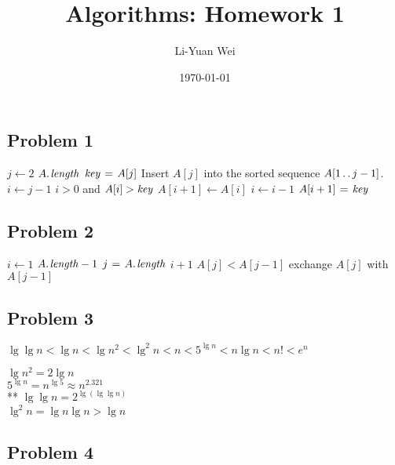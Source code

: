 \documentclass[a4paper]{article}
\makeatletter
\newenvironment{solution}
  {\begin{proof}[Solution]}
  {\end{proof}}
\renewenvironment{proof}[1][\proofname]{%
  \par\pushQED{\qed}\normalfont%
  \topsep6\p@\@plus6\p@\relax
  \trivlist\item[\hskip\labelsep\bfseries#1\@addpunct{.}]%
  \ignorespaces
}{%
  \popQED\endtrivlist\@endpefalse
}
\makeatother
\begin{document}
\title{Algorithms: Homework 1}
\author{Li-Yuan Wei}
\date{\today}
\maketitle

\subsection*{Problem 1}
\begin{codebox}
\li \For $j \gets 2$ \To $\attrib{A}{length}$
\li \Do
$\id{key} \gets A[j]$
\li \Comment Insert $A[j]$ into the sorted sequence
$A[1 \mathinner{\ldotp\ldotp} j-1]$.
\li $i \gets j-1$
\li \While $i > 0$ and $A[i] > \id{key}$
\li \Do
$A[i+1] \gets A[i]$
\li $i \gets i-1$
\End
\li $A[i+1] \gets \id{key}$
\End
\end{codebox}

\begin{solution}
\end{solution}

\subsection*{Problem 2}
\begin{codebox}
\li \For $i \gets 1$ \To $\attrib{A}{length} - 1$
\li \Do \For $j \gets \attrib{A}{length}$ \Downto $i + 1$
\li \Do \If $A[j] < A[j-1]$
\li \Then exchange $A[j]$ with $A[j-1]$
\End
\End
\End
\end{codebox}

\begin{solution}
\end{solution}

\subsection*{Problem 3}

\begin{solution}
  $\lg\lg n < \lg n < \lg n^2 < \lg^2 n< n < 5^{\lg n} < n \lg n < n! < e^n$

 $\lg n^2 = 2\lg n$ \\
 $5^{\lg n} = n^{\lg 5} \approx n^{2.321}$ \\
 ** $\lg\lg n = 2^{\lg(\lg\lg n)}$ \\
 $\lg^2 n = \lg n \lg n > \lg n$
\end{solution}

\subsection*{Problem 4}
\end{document}
